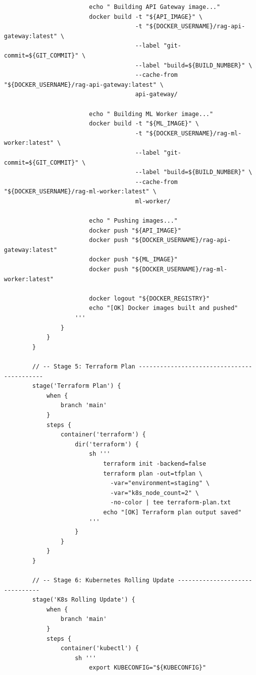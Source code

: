 \documentclass[12pt,a4paper]{report}
\begin{document}
\begin{lstlisting}
                        echo " Building API Gateway image..."
                        docker build -t "${API_IMAGE}" \
                                     -t "${DOCKER_USERNAME}/rag-api-gateway:latest" \
                                     --label "git-commit=${GIT_COMMIT}" \
                                     --label "build=${BUILD_NUMBER}" \
                                     --cache-from "${DOCKER_USERNAME}/rag-api-gateway:latest" \
                                     api-gateway/

                        echo " Building ML Worker image..."
                        docker build -t "${ML_IMAGE}" \
                                     -t "${DOCKER_USERNAME}/rag-ml-worker:latest" \
                                     --label "git-commit=${GIT_COMMIT}" \
                                     --label "build=${BUILD_NUMBER}" \
                                     --cache-from "${DOCKER_USERNAME}/rag-ml-worker:latest" \
                                     ml-worker/

                        echo " Pushing images..."
                        docker push "${API_IMAGE}"
                        docker push "${DOCKER_USERNAME}/rag-api-gateway:latest"
                        docker push "${ML_IMAGE}"
                        docker push "${DOCKER_USERNAME}/rag-ml-worker:latest"

                        docker logout "${DOCKER_REGISTRY}"
                        echo "[OK] Docker images built and pushed"
                    '''
                }
            }
        }

        // -- Stage 5: Terraform Plan -------------------------------------------
        stage('Terraform Plan') {
            when {
                branch 'main'
            }
            steps {
                container('terraform') {
                    dir('terraform') {
                        sh '''
                            terraform init -backend=false
                            terraform plan -out=tfplan \
                              -var="environment=staging" \
                              -var="k8s_node_count=2" \
                              -no-color | tee terraform-plan.txt
                            echo "[OK] Terraform plan output saved"
                        '''
                    }
                }
            }
        }

        // -- Stage 6: Kubernetes Rolling Update -------------------------------
        stage('K8s Rolling Update') {
            when {
                branch 'main'
            }
            steps {
                container('kubectl') {
                    sh '''
                        export KUBECONFIG="${KUBECONFIG}"


\end{lstlisting}
\end{document}
